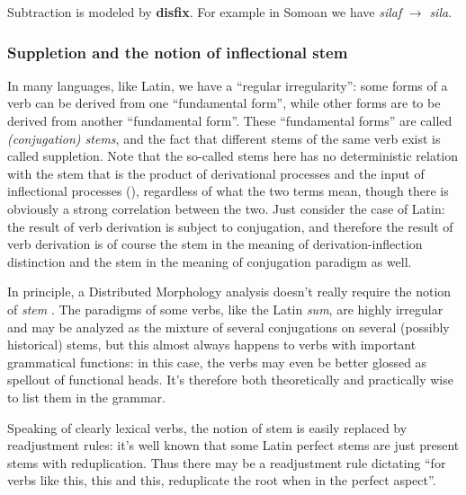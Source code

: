 \documentclass[UTF8, a4paper, oneside, scheme=plain]{ctexart}
\newcommand*{\concept}[1]{\textbf{#1}}
\newcommand*{\term}[1]{\emph{#1}}
\newcommand*{\corpus}[1]{\emph{#1}}
\begin{document}
Subtraction is modeled by \concept{disfix}.
For example in Somoan we have \corpus{silaf} $\to$ \corpus{sila}.

\subsubsection{Suppletion and the notion of inflectional stem}

In many languages, like Latin,
we have a ``regular irregularity'':
some forms of a verb can be derived from one ``fundamental form'',
while other forms are to be derived from another ``fundamental form''.
These ``fundamental forms'' are called \term{(conjugation) stems},
and the fact that different stems of the same verb exist 
is called suppletion.
Note that the so-called stems here has no deterministic relation with the stem 
that is the product of derivational processes and the input of inflectional processes
(),
regardless of what the two terms mean,
though there is obviously a strong correlation between the two.
Just consider the case of Latin:
the result of verb derivation is subject to conjugation,
and therefore the result of verb derivation is of course the stem 
in the meaning of derivation-inflection distinction
and the stem in the meaning of conjugation paradigm as well.

In principle, a Distributed Morphology analysis doesn't really require the notion of \term{stem}
\citep{embick2005status}.
The paradigms of some verbs, like the Latin \corpus{sum}, are highly irregular and may be analyzed 
as the mixture of several conjugations on several (possibly historical) stems,
but this almost always happens to verbs with important grammatical functions:
in this case, the verbs may even be better glossed as spellout of functional heads.
It's therefore both theoretically and practically wise to list them in the grammar.

Speaking of clearly lexical verbs, the notion of stem is easily replaced by 
readjustment rules:
it's well known that some Latin perfect stems are just present stems with reduplication.
Thus there may be a readjustment rule dictating 
``for verbs like this, this and this, 
reduplicate the root when in the perfect aspect''.
\end{document}
